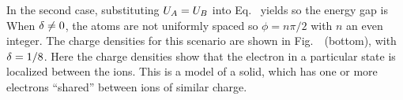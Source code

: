 {	In the second case, substituting $U_A = U_B$ into Eq.~ yields
	so the energy gap is
	When $\delta \neq 0$, the atoms are not uniformly spaced so $\phi = n \pi / 2$ with $n$ an even integer.  The charge densities for this scenario are shown in Fig.~~(bottom), with $\delta = 1/8$.  Here the charge densities show that the electron in a particular state is localized between the ions.  This is a model of a  solid, which has one or more electrons ``shared'' between ions of similar charge.
}